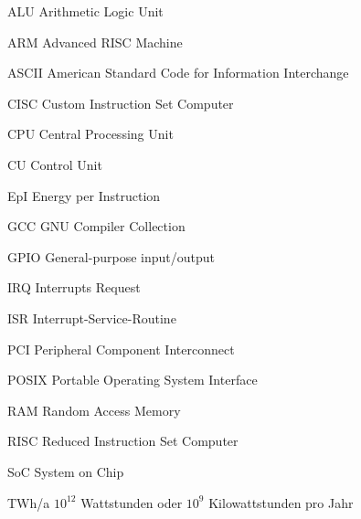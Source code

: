 \begin{abkuerzungen}[MUSTER] %
\item[ALU] Arithmetic Logic Unit
\item[ARM] Advanced RISC Machine
\item[ASCII] American Standard Code for Information Interchange
\item[CISC] Custom Instruction Set Computer
\item[CPU] Central Processing Unit
\item[CU] Control Unit
\item[EpI] Energy per Instruction
\item[GCC] GNU Compiler Collection
\item[GPIO] General-purpose input/output
\item[IRQ] Interrupts Request
\item[ISR] Interrupt-Service-Routine
\item[PCI] Peripheral Component Interconnect
\item[POSIX] Portable Operating System Interface
\item[RAM] Random Access Memory
\item[RISC] Reduced Instruction Set Computer
\item[SoC] System on Chip
\item[TWh/a] $10^{12}$ Wattstunden oder $10^{9}$ Kilowattstunden pro Jahr


\end{abkuerzungen}
